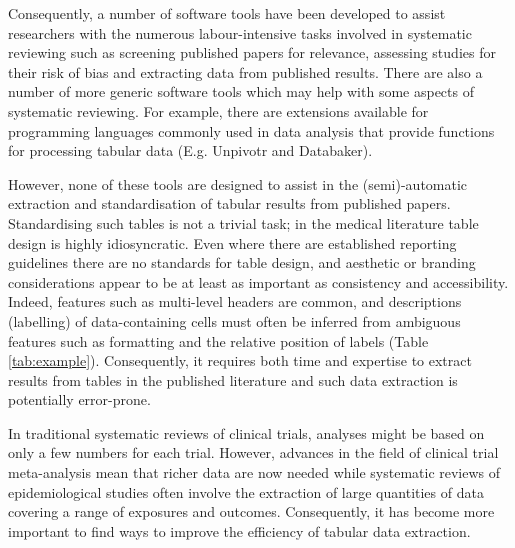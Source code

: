 \documentclass[10.7pt,]{article}
\begin{document}

Consequently, a number of software tools\cite{systematicReviewTools} have been developed to assist researchers with the numerous labour-intensive tasks involved in systematic reviewing such as screening published papers for relevance, assessing studies for their risk of bias and extracting data from published results\cite{jonnalagadda2015automating, 10.1093/ije/dyv306, Tsafnat2014}. There are also a number of more generic software tools which may help with some aspects of systematic reviewing. For example, there are extensions available for programming languages commonly used in data analysis that provide functions for processing tabular data (E.g. Unpivotr\cite{unpivotr} and Databaker\cite{databaker}).

However, none of these tools are designed to assist in the (semi)-automatic extraction and standardisation of tabular results from published papers. Standardising such tables is not a trivial task; in the medical literature table design is highly idiosyncratic. Even where there are established reporting guidelines\cite{bian2011consort} there are no standards for table design, and aesthetic or branding considerations appear to be at least as important as consistency and accessibility. Indeed, features such as multi-level headers are common, and descriptions (labelling) of data-containing cells must often be inferred from ambiguous features such as formatting and the relative position of labels (Table \ref{tab:example}). Consequently, it requires both time and expertise to extract results from tables in the published literature and such data extraction is potentially error-prone.

In traditional systematic reviews of clinical trials, analyses might be based on only a few numbers for each trial. However, advances in the field of clinical trial meta-analysis mean that richer data are now needed \cite{phillippo_dias_elsada_ades_welton_2019} while systematic reviews of epidemiological studies often involve the extraction of large quantities of data covering a range of exposures and outcomes\cite{shah2015short}. Consequently, it has become more important to find ways to improve the efficiency of tabular data extraction. 
\end{document}
